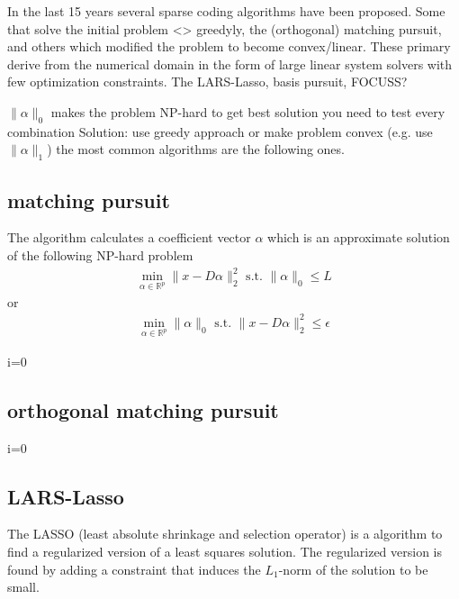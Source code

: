 In the last 15 years several sparse coding algorithms have been proposed. 
Some that solve the initial problem <> greedyly, the (orthogonal) matching pursuit, and others which modified the problem to become convex/linear. These primary derive from the numerical domain in the form of 
large linear system solvers with few optimization constraints. The LARS-Lasso, basis pursuit, FOCUSS?


$\lVert\alpha\rVert_{0}$ makes the problem NP-hard
to get best solution you need to test every combination
Solution:
use greedy approach or make problem convex (e.g. use $\lVert\alpha\rVert_{1}$)
the most common algorithms are the following ones.


\subsection{matching pursuit}
The algorithm calculates a coefficient vector $\alpha$ which is an approximate solution of the following NP-hard problem
\begin{align}
\min_{\alpha\in\mathbb{R}^{p}}  \lVert x - D\alpha \rVert^{2}_{2} \textrm{ s.t. } \lVert \alpha \rVert_{0} \leq L
\end{align}
or
\begin{align}
\min_{\alpha\in\mathbb{R}^{p}}   \lVert \alpha \rVert_{0}   \textrm{ s.t. } \lVert x - D\alpha \rVert^{2}_{2} \leq \epsilon
\end{align}
\cite{Mallat1993}
\begin{algorithm}
\begin{algorithmic}
\STATE i=0
\end{algorithmic}
\end{algorithm}

\subsection{orthogonal matching pursuit}
\cite{Pati1993}
\label{sec:omp}
\begin{algorithm}
\begin{algorithmic}
\STATE i=0
\end{algorithmic}
\end{algorithm}

\subsection{LARS-Lasso}
The LASSO (least absolute shrinkage and selection operator) is a algorithm to find a regularized version of a least squares solution.
The regularized version is found by adding a constraint that induces the $L_1$-norm of the solution to be small.

